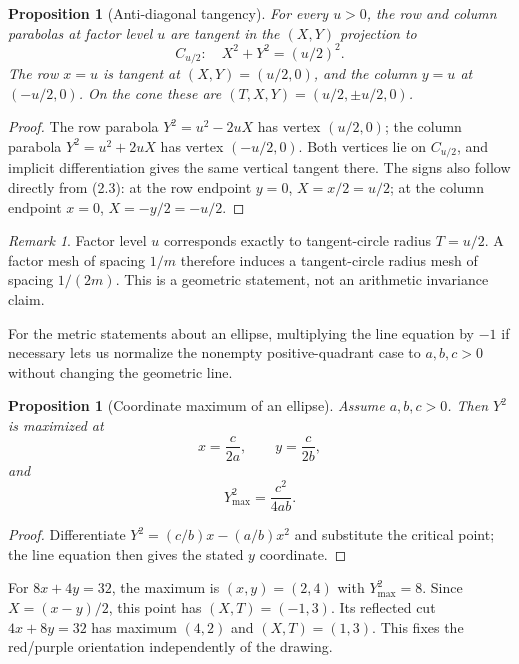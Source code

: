 \documentclass[11pt]{amsart}
\newtheorem{proposition}[theorem]{Proposition}
\theoremstyle{remark}
\newtheorem*{remark}{Remark}
\numberwithin{equation}{section}
\begin{document}
\begin{proposition}[Anti-diagonal tangency]\label{prop:tangent}
For every $u>0$, the row and column parabolas at factor level $u$ are tangent in the $(X,Y)$ projection to
\begin{equation}
C_{u/2}:\quad X^2+Y^2=(u/2)^2.
\end{equation}
The row $x=u$ is tangent at $(X,Y)=(u/2,0)$, and the column $y=u$ at $(-u/2,0)$. On the cone these are $(T,X,Y)=(u/2,\pm u/2,0)$.
\end{proposition}
\begin{proof}
The row parabola $Y^2=u^2-2uX$ has vertex $(u/2,0)$; the column parabola $Y^2=u^2+2uX$ has vertex $(-u/2,0)$. Both vertices lie on $C_{u/2}$, and implicit differentiation gives the same vertical tangent there. The signs also follow directly from (2.3): at the row endpoint $y=0$, $X=x/2=u/2$; at the column endpoint $x=0$, $X=-y/2=-u/2$.
\end{proof}

\begin{remark}
Factor level $u$ corresponds exactly to tangent-circle radius $T=u/2$. A factor mesh of spacing $1/m$ therefore induces a tangent-circle radius mesh of spacing $1/(2m)$. This is a geometric statement, not an arithmetic invariance claim.
\end{remark}

For the metric statements about an ellipse, multiplying the line equation by $-1$ if necessary lets us normalize the nonempty positive-quadrant case to $a,b,c>0$ without changing the geometric line.

\begin{proposition}[Coordinate maximum of an ellipse]\label{prop:semiaxes}
Assume $a,b,c>0$. Then $Y^2$ is maximized at
\begin{equation}
x=\frac{c}{2a},\qquad y=\frac{c}{2b},
\end{equation}
and
\begin{equation}
Y_{\max}^2=\frac{c^2}{4ab}.
\end{equation}
\end{proposition}
\begin{proof}
Differentiate $Y^2=(c/b)x-(a/b)x^2$ and substitute the critical point; the line equation then gives the stated $y$ coordinate.
\end{proof}

For $8x+4y=32$, the maximum is $(x,y)=(2,4)$ with $Y^2_{\max}=8$. Since $X=(x-y)/2$, this point has $(X,T)=(-1,3)$. Its reflected cut $4x+8y=32$ has maximum $(4,2)$ and $(X,T)=(1,3)$. This fixes the red/purple orientation independently of the drawing.
\end{document}
